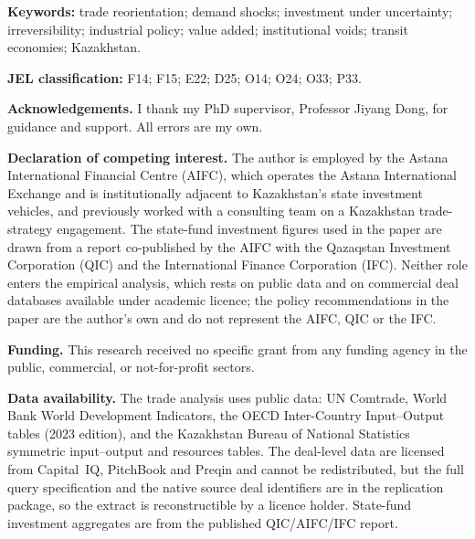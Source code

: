 \documentclass[12pt]{article}
\begin{document}
\vspace{1em}
\noindent\textbf{Keywords:} trade reorientation; demand shocks; investment under uncertainty;
irreversibility; industrial policy; value added; institutional voids; transit economies;
Kazakhstan.

\vspace{0.5em}
\noindent\textbf{JEL classification:} F14; F15; E22; D25; O14; O24; O33; P33.

\vspace{2em}

\noindent\textbf{Acknowledgements.} I thank my PhD supervisor, Professor Jiyang Dong, for
guidance and support. All errors are my own.

\vspace{1.5em}

\noindent\textbf{Declaration of competing interest.}
The author is employed by the Astana International Financial Centre (AIFC), which operates the
Astana International Exchange and is institutionally adjacent to Kazakhstan's state investment
vehicles, and previously worked with a consulting team on a Kazakhstan trade-strategy
engagement. The state-fund investment figures used in the paper are drawn from a report
co-published by the AIFC with the Qazaqstan Investment Corporation (QIC) and the International
Finance Corporation (IFC). Neither role enters the empirical analysis, which rests on public
data and on commercial deal databases available under academic licence; the policy
recommendations in the paper are the author's own and do not represent the AIFC, QIC or the
IFC.

\vspace{0.8em}
\noindent\textbf{Funding.}
This research received no specific grant from any funding agency in the public, commercial, or
not-for-profit sectors.

\vspace{0.8em}
\noindent\textbf{Data availability.}
The trade analysis uses public data: UN Comtrade, World Bank World Development Indicators, the
OECD Inter-Country Input--Output tables (2023 edition), and the Kazakhstan Bureau of National
Statistics symmetric input--output and resources tables. The deal-level data are licensed from
Capital~IQ, PitchBook and Preqin and cannot be redistributed, but the full query
specification and the native source deal identifiers are in the replication package, so the
extract is reconstructible by a licence holder. State-fund investment aggregates are from the
published QIC/AIFC/IFC report.
\end{document}
